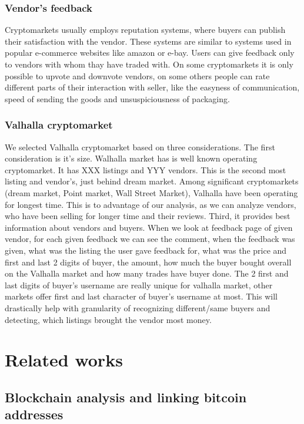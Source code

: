 \documentclass[
  digital, %
  table,   %
  lof,     %
  lot,     %
  oneside
]{fithesis3}
\begin{document}
\subsection{Vendor's feedback}

Cryptomarkets usually employs reputation systems, where buyers can publish their satisfaction with the vendor.
These systems are similar to systems used in popular e-commerce websites like amazon or e-bay.
Users can give feedback only to vendors with whom thay have traded with.
On some cryptomarkets it is only possible to upvote and downvote vendors, on some others people can
rate different parts of their interaction with seller, like the easyness of communication,
speed of sending the goods and unsuspiciousness of packaging.

\subsection{Valhalla cryptomarket}

We selected Valhalla cryptomarket based on three considerations.
The first consideration is it's size. Walhalla market has is well known operating cryptomarket. It has XXX listings and YYY vendors.
This is the second most listing and vendor's, just behind dream market.
Among significant cryptomarkets (dream market, Point market, Wall Street Market), Valhalla
have been operating for longest time. This is to advantage of our analysis, as we can 
analyze vendors, who have been selling for longer time and their reviews.
Third, it provides best information about vendors and buyers.
When we look at feedback page of given vendor, for each given feedback we can see the comment, when the feedback was given,
what was the listing the user gave feedback for, what was the price and first and last 2 digits of buyer,
the amount, how much the buyer bought overall on the Valhalla market and how many trades have buyer done.
The 2 first and last digits of buyer's username are really unique for valhalla market,
other markets offer first and last character of buyer's username at most.
This will drastically help with granularity of recognizing different/same buyers and detecting,
which listings brought the vendor most money.


\chapter{Related works}
\section{Blockchain analysis and linking bitcoin addresses}
\end{document}
